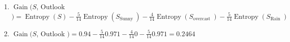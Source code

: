 \documentclass[9pt,dvipsnames]{beamer}
\begin{document}
	\begin{frame}
		\begin{columns}
		\includegraphics[width=\textwidth]{imgs/algorithm_9.png}
		
		\begin{enumerate}
			\item 	\(\operatorname{Gain}(S\), Outlook \()= \operatorname{Entropy}(S)-\frac{5}{14} \operatorname{Entropy}\left(S_{\text {Sunny }}\right)-\frac{4}{14} \operatorname{Entropy}\left(S_{\text {overcast }}\right)-\frac{5}{14} \operatorname{Entropy}\left(S_{\text {Rain }}\right)\)
			\item 	\(\operatorname{Gain}(S\), Outlook \()=0.94-\frac{5}{14} 0.971-\frac{4}{14} 0-\frac{5}{14} 0.971=0.2464\)
		\end{enumerate}
		\end{columns}
	\end{frame}
\end{document}
